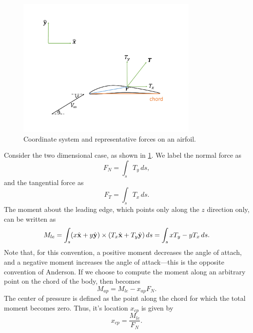 \documentclass[oneside,a4paper,11pt]{report}
\begin{document}
\begin{figure}[ht]
   \centering
   \includegraphics[width=0.8\textwidth]{../../images/airfoil.pdf}
   \caption{Coordinate system and representative forces on an airfoil.}
   \label{fig:airfoil}
\end{figure}

Consider the two dimensional case, as shown in \cref{fig:airfoil}. We label the normal force as
\begin{equation}
    F_N = \int_s T_y \, ds,
\end{equation}
and the tangential force as
\begin{equation}
    F_T = \int_s T_x \, ds.
\end{equation}
The moment about the leading edge, which points only along the $z$ direction only, can be written as
\begin{equation}
    M_{le} = \int_s (x \hat{\mathbf{x}} + y \hat{\mathbf{y}} ) \times (T_x \hat{\mathbf{x}} + T_y \hat{\mathbf{y}}) \, ds = \int_s x T_y - y T_x \, ds.
\end{equation}
Note that, for this convention, a positive moment decreases the angle of attach, and a negative moment increases the angle of attack---this is the opposite convention of Anderson. If we choose to compute the moment along an arbitrary point on the chord of the body, then  becomes
\begin{equation}
    M_{ap} = M_{le} - x_{ap} F_N.
\end{equation}
The center of pressure is defined as the point along the chord for which the total moment becomes zero. Thus, it's location $x_{cp}$ is given by
\begin{equation}
    x_{cp} = \frac{M_{le}}{F_N}.
\end{equation}
\end{document}
